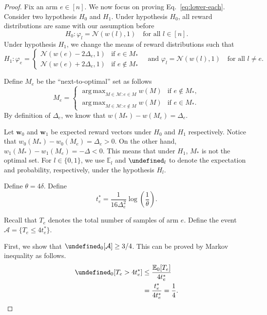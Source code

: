 \documentclass{article}
\newcommand{\Rew}{\varphi}
\newcommand{\E}{\mathbb E}
\newcommand{\M}{\mathcal M}
\DeclareMathOperator*{\argmax}{arg\,max}
\let\Pr\undefined
\DeclareMathOperator{\Pr}{Pr}
\renewcommand{\vec}[1]{\boldsymbol{#1}}
\begin{document}
\begin{spacing}{1.1}
\begin{proof}
Fix an arm $e\in [n]$. We now focus on proving Eq.~\eqref{eq:lower-each}.
Consider two hypothesis $H_0$ and $H_1$. 
Under hypothesis $H_0$, all reward distributions are same with our assumption before
$$
H_0: \Rew_l = \mathcal N(w(l),1) \quad \text{for all } l \in [n].
$$
Under hypothesis $H_1$, we change the means of reward distributions such that 
$$
H_1: 
	\Rew_e = \begin{cases}
	\mathcal N(w(e)-2\Delta_e,1) & \text{if } e\in M_*\\
	\mathcal N(w(e)+2\Delta_e,1) & \text{if } e\not\in M_*
\end{cases} 
\quad\text{and } \Rew_l=\mathcal N(w(l), 1) \quad\text{for all } l\not = e.
$$

Define $M_e$ be the ``next-to-optimal'' set as follows 
$$
M_e = \begin{cases}
		 \argmax_{M\in \M: e \in M} w(M) & \text{if } e\not \in M_*, \\
	     \argmax_{M\in \M: e \not\in M} w(M) & \text{if } e\in M_*.
	  \end{cases}
$$
By definition of $\Delta_e$, we know that $w(M_*)-w(M_e)=\Delta_e$.

Let $\vec w_0$ and $\vec w_1$ be expected reward vectors under $H_0$ and $H_1$ respectively.
Notice that $w_0(M_*)-w_0(M_e)=\Delta_e > 0$.
On the other hand, 
$w_1(M_*)-w_1(M_e) = -\Delta < 0$.
This means that under $H_1$, $M_*$ is not the optimal set.
For $l\in \{0,1\}$, we use $\E_l$ and $\Pr_l$ to denote the expectation and probability, respectively, under the hypothesis $H_l$.

Define $\theta=4\delta$. Define
\begin{equation}
t_e^* = \frac{1}{16\Delta^2_e}\log\left(\frac{1}{\theta}\right).
\label{eq:define-tstar}
\end{equation}

Recall that $T_e$ denotes the total number of samples of arm $e$.
Define the event
$\mathcal A = \{T_e \le 4t_e^* \}$.

First, we show that $\Pr_0[\mathcal A] \ge 3/4$. 
This can be proved by Markov inequality as follows.
\begin{align*}
\Pr_0[T_e > 4t_e^*] &\le \frac{\E_0[T_e]}{4t_e^*} \\
					  &= \frac{t_e^*}{4t_e^*} = \frac14.
\end{align*}


\end{proof}
\end{spacing}
\end{document}
